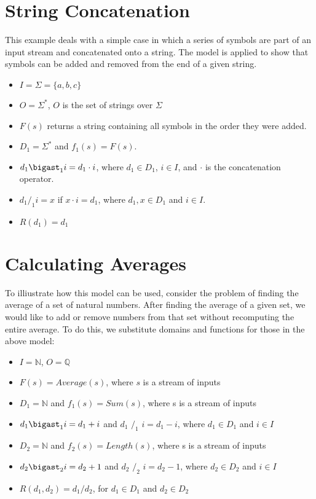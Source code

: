 \documentclass[30pt]{article}
\begin{document}



\section{String Concatenation}

\indent This example deals with a simple case in which a series of symbols are part of an input stream and concatenated onto a string. The model is applied to show that symbols can be added and removed from the end of a given string. 

\begin{itemize}
\item $I = \Sigma = \{a, b, c \}$
\item $O = \Sigma^*$, $O$ is the set of strings over $\Sigma$
\item $F(s)$ returns a string containing all symbols in the order they were added.
\item $D_1 = \Sigma^*$ and $f_1(s) = F(s)$.
\item $d_1 \bigast_1 i = d_1 \cdot i$, where $d_1 \in D_1$, $i \in I$, and $\cdot$ is the concatenation operator.
\item $d_1 /_1 i = x$ if $x \cdot i  = d_1$, where $d_1, x \in D_1$ and $i \in I$. 
\item $R(d_1) = d_1$  
\end{itemize}


\section{Calculating Averages}

\indent To illiustrate how this model can be used, consider the problem of finding the average of a set of natural numbers. After finding the average of a given set, we would like to add or remove numbers from that set without recomputing the entire average. To do this, we substitute domains and functions for those in the above model:

\begin{itemize}
\item $I = \mathbb{N}$,  $O = \mathbb{Q}$
\item $F(s) = Average(s)$, where $s$ is a stream of inputs
\item $D_1 = \mathbb{N}$ and $f_1(s) = Sum(s)$, where s is a stream of inputs
\item $d_1 \bigast_1 i = d_1 + i$ and $d_1$ $/_1$ $ i = d_1 - i$, where $d_1 \in D_1$ and $i \in I$  
\item $D_2 = \mathbb{N}$ and $f_2(s) = Length(s)$, where s is a stream of inputs
\item $d_2 \bigast_2 i = d_2 + 1$ and $d_2$ $/_2$ $i = d_2 - 1$, where $d_2 \in D_2$ and $i \in I$ 
\item $R(d_1, d_2)=d_1 / d_2$, for $d_1 \in D_1$ and $d_2 \in D_2$ 

\end{itemize}	
\end{document}
